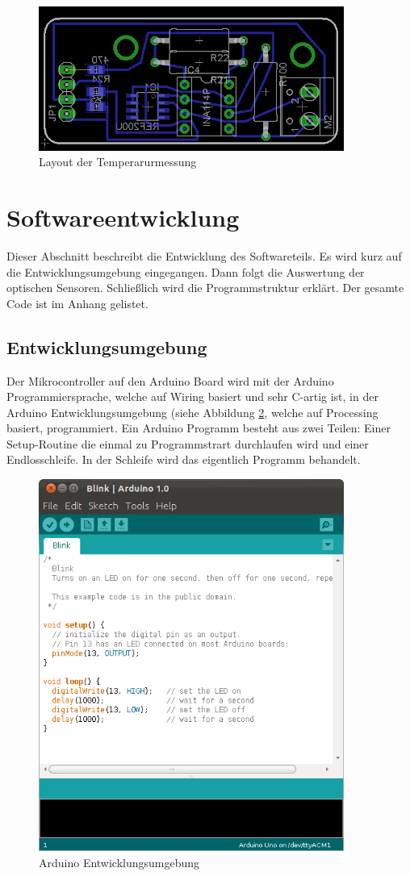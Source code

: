 \documentclass[a4paper,bibtotoc,oneside]{scrbook}
\begin{document}
\begin{figure}[htbp]
\centering
\includegraphics[width=100mm]{img/tmess2.png}
\caption[Arduino Mega 2560]{Layout der Temperarurmessung}\label{tmess2}
\end{figure}


\section{Softwareentwicklung}\thispagestyle{empty}
Dieser Abschnitt beschreibt die Entwicklung des Softwareteils. Es wird kurz auf die Entwicklungsumgebung eingegangen. Dann folgt die Auswertung der optischen Sensoren. Schließlich wird die Programmstruktur erklärt. Der gesamte Code ist im Anhang gelistet.

\subsection{Entwicklungsumgebung}\thispagestyle{empty}
Der Mikrocontroller auf den Arduino Board wird mit der Arduino Programmiersprache, welche auf Wiring basiert und sehr C-artig ist, in der Arduino Entwicklungsumgebung (siehe Abbildung \ref{ardu2}, welche auf Processing basiert, programmiert. 
Ein Arduino Programm besteht aus zwei Teilen: Einer Setup-Routine die einmal zu Programmstrart durchlaufen wird und einer Endlosschleife. In der Schleife wird das eigentlich Programm behandelt. 

\begin{figure}[htbp]
\centering
\includegraphics[width=100mm]{img/Arduino.png}
\caption[Die Arduino Entwicklungsumgebung]{Arduino Entwicklungsumgebung}\label{ardu2}
\end{figure}
\end{document}
